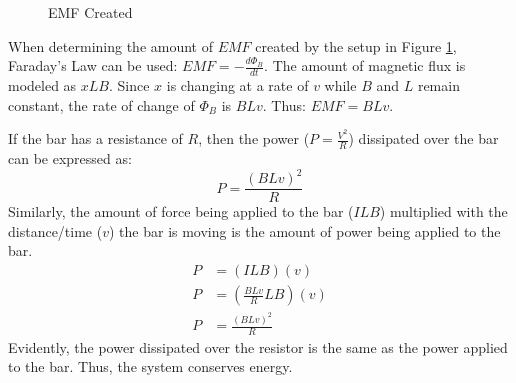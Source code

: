 \documentclass[12pt]{article}
\begin{document}
\begin{figure}[H]
  \centering
  
  \caption{EMF Created}
  \label{fig:046}
\end{figure}

When determining the amount of $EMF$ created by the setup in Figure \ref{fig:046},
Faraday's Law can be used: $EMF = - \frac{d \Phi_B}{dt}$. The amount of magnetic flux is
modeled as $xLB$. Since $x$ is changing at a rate of $v$ while $B$ and $L$ remain constant,
the rate of change of $\Phi_B$ is $BLv$. Thus: $EMF = BLv$.

If the bar has a resistance of $R$, then the power ($P = \frac{V^2}{R}$) dissipated over
the bar can be expressed as:
\begin{equation*}
  P = \frac{(BLv)^2}{R}
\end{equation*}
Similarly, the amount of force being applied to the bar ($ILB$) multiplied with the
distance/time ($v$) the bar is moving is the amount of power being applied to the bar.
\begin{align*}
  P &= (ILB)(v) \\
  P &= (\frac{BLv}{R}LB)(v) \\
  P &= \frac{(BLv)^2}{R}
\end{align*}
Evidently, the power dissipated over the resistor is the same as the power applied to the
bar. Thus, the system conserves energy.
\end{document}
